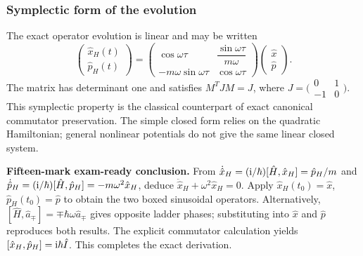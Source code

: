 \documentclass[11pt,a4paper]{article}
\begin{document}
\subsubsection{Symplectic form of the evolution}
The exact operator evolution is linear and may be written
\begin{equation}
\boxed{\begin{pmatrix}\hat x_H(t)\\\hat p_H(t)\end{pmatrix}
=\begin{pmatrix}\cos\omega\tau&\dfrac{\sin\omega\tau}{m\omega}\\[4pt]-m\omega\sin\omega\tau&\cos\omega\tau\end{pmatrix}
\begin{pmatrix}\hat x\\\hat p\end{pmatrix}.}
\end{equation}
The matrix has determinant one and satisfies \(M^TJM=J\), where \(J=\bigl(\begin{smallmatrix}0&1\\-1&0\end{smallmatrix}\bigr)\). This symplectic property is the classical counterpart of exact canonical commutator preservation. The simple closed form relies on the quadratic Hamiltonian; general nonlinear potentials do not give the same linear closed system.

\textbf{Fifteen-mark exam-ready conclusion.} From \(\dot{\hat x}_H=(\mathrm{i}/\hbar)[\hat H,\hat x_H]=\hat p_H/m\) and \(\dot{\hat p}_H=(\mathrm{i}/\hbar)[\hat H,\hat p_H]=-m\omega^2\hat x_H\), deduce \(\ddot{\hat x}_H+\omega^2\hat x_H=0\). Apply \(\hat x_H(t_0)=\hat x\), \(\hat p_H(t_0)=\hat p\) to obtain the two boxed sinusoidal operators. Alternatively, \([\hat H,\hat a_\mp]=\mp\hbar\omega\hat a_\mp\) gives opposite ladder phases; substituting into \(\hat x\) and \(\hat p\) reproduces both results. The explicit commutator calculation yields \([\hat x_H,\hat p_H]=\mathrm{i}\hbar\hat I\). This completes the exact derivation.
\end{document}
